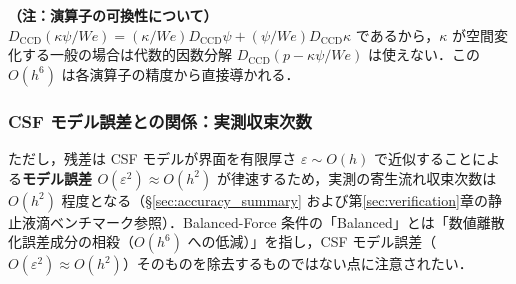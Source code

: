 \noindent\textbf{（注：演算子の可換性について）}
$D_{\mathrm{CCD}}(\kappa\psi/We) = (\kappa/We)D_{\mathrm{CCD}}\psi + (\psi/We)D_{\mathrm{CCD}}\kappa$
であるから，$\kappa$ が空間変化する一般の場合は代数的因数分解 $D_{\mathrm{CCD}}(p-\kappa\psi/We)$ は使えない．この $O(h^6)$ は各演算子の精度から直接導かれる．

\subsubsection{CSF モデル誤差との関係：実測収束次数}

ただし，残差は CSF モデルが界面を有限厚さ $\varepsilon \sim O(h)$ で近似することによる\textbf{モデル誤差 $O(\varepsilon^2) \approx O(h^2)$} が律速するため，実測の寄生流れ収束次数は $O(h^2)$ 程度となる（§\ref{sec:accuracy_summary} および第\ref{sec:verification}章の静止液滴ベンチマーク参照）．Balanced-Force 条件の「Balanced」とは「数値離散化誤差成分の相殺（$O(h^6)$ への低減）」を指し，CSF モデル誤差（$O(\varepsilon^2) \approx O(h^2)$）そのものを除去するものではない点に注意されたい．
